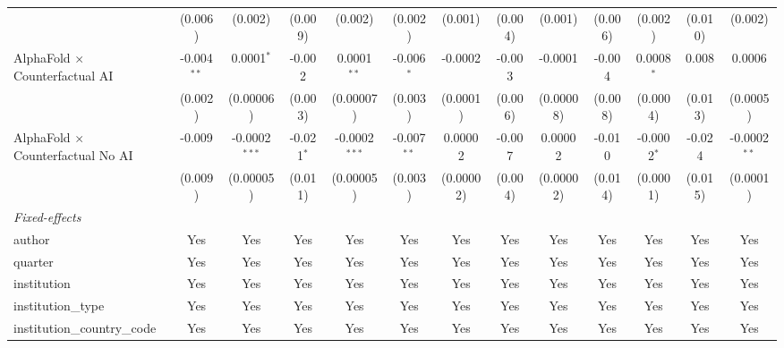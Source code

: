 \begin{tabular}{lcccccccccccc}
                                            & (0.006)       & (0.002)         & (0.009)       & (0.002)         & (0.002)       & (0.001)   & (0.004)      & (0.001)   & (0.006)       & (0.002)       & (0.010)       & (0.002)\\   
   AlphaFold $\times$ Counterfactual AI     & -0.004$^{**}$ & 0.0001$^{*}$    & -0.002        & 0.0001$^{**}$   & -0.006$^{*}$  & -0.0002   & -0.003       & -0.0001   & -0.004        & 0.0008$^{*}$  & 0.008         & 0.0006\\   
                                            & (0.002)       & (0.00006)       & (0.003)       & (0.00007)       & (0.003)       & (0.0001)  & (0.006)      & (0.00008) & (0.008)       & (0.0004)      & (0.013)       & (0.0005)\\   
   AlphaFold $\times$ Counterfactual No AI  & -0.009        & -0.0002$^{***}$ & -0.021$^{*}$  & -0.0002$^{***}$ & -0.007$^{**}$ & 0.00002   & -0.007       & 0.00002   & -0.010        & -0.0002$^{*}$ & -0.024        & -0.0002$^{**}$\\   
                                            & (0.009)       & (0.00005)       & (0.011)       & (0.00005)       & (0.003)       & (0.00002) & (0.004)      & (0.00002) & (0.014)       & (0.0001)      & (0.015)       & (0.0001)\\   
   \midrule
   \emph{Fixed-effects}\\
   author                                   & Yes           & Yes             & Yes           & Yes             & Yes           & Yes       & Yes          & Yes       & Yes           & Yes           & Yes           & Yes\\  
   quarter                                  & Yes           & Yes             & Yes           & Yes             & Yes           & Yes       & Yes          & Yes       & Yes           & Yes           & Yes           & Yes\\  
   institution                              & Yes           & Yes             & Yes           & Yes             & Yes           & Yes       & Yes          & Yes       & Yes           & Yes           & Yes           & Yes\\  
   institution\_type                        & Yes           & Yes             & Yes           & Yes             & Yes           & Yes       & Yes          & Yes       & Yes           & Yes           & Yes           & Yes\\  
   institution\_country\_code               & Yes           & Yes             & Yes           & Yes             & Yes           & Yes       & Yes          & Yes       & Yes           & Yes           & Yes           & Yes\\  

\end{tabular}
